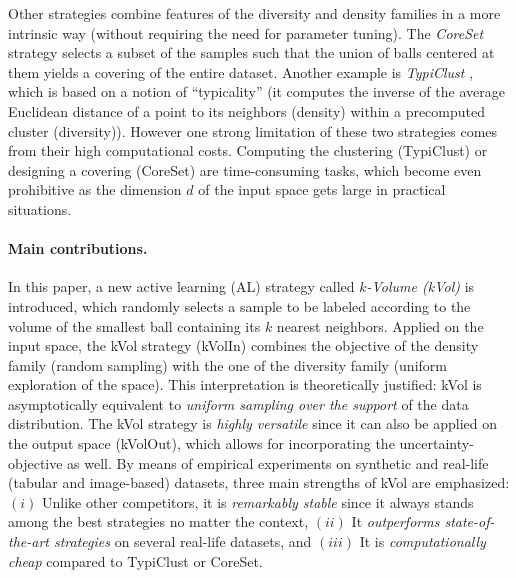 \documentclass[twoside]{article}
\theoremstyle{definition}
\theoremstyle{remark}
\begin{document}
Other strategies combine features of the diversity and density families in a more intrinsic way (without requiring the need for parameter tuning). 
%
The \emph{CoreSet} strategy \citep{senerActiveLearningConvolutional2018} selects a subset of the samples such that the union of balls centered at them yields a covering of the entire dataset. 
%
%
Another example is \emph{TypiClust} \citep{hacohenActiveLearningBudget2022}, which is based on a notion of ``typicality'' (it computes the inverse of the average Euclidean distance of a point to its neighbors (density) within a precomputed cluster (diversity)).
%
However one strong limitation of these two strategies comes from their high computational costs. Computing the clustering (TypiClust) or designing a covering (CoreSet) are time-consuming tasks, which become even prohibitive as the dimension $d$ of the input space gets large in practical situations.




\paragraph*{Main contributions.}
In this paper, a new active learning (AL) strategy called \emph{$k$-Volume (kVol)} is introduced, which randomly selects a sample to be labeled according to the volume of the smallest ball containing its $k$ nearest neighbors. 
%
Applied on the input space, the kVol strategy (kVolIn) combines the objective of the density family (random sampling) with the one of the diversity family (uniform exploration of the space). 
%
This interpretation is theoretically justified: kVol is asymptotically equivalent to \emph{uniform sampling over the support} of the data distribution.
%
The kVol strategy is \emph{highly versatile} since it can also be applied on the output space (kVolOut), which allows for incorporating the uncertainty-objective as well. 
%
By means of empirical experiments on synthetic and real-life (tabular and image-based) datasets, three main strengths of kVol are emphasized: $(i)$ Unlike other competitors, it is \emph{remarkably stable} since it always stands among the best strategies no matter the context, $(ii)$ It \emph{outperforms state-of-the-art strategies} on several real-life datasets, and $(iii)$ It is \emph{computationally cheap} compared to TypiClust or CoreSet. 
\end{document}
